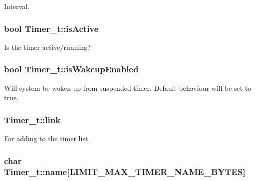 Interval. 

\subsubsection[{\texorpdfstring{is\+Active}{isActive}}]{\setlength{\rightskip}{0pt plus 5cm}bool Timer\+\_\+t\+::is\+Active}\hypertarget{struct_timer__t_ab30c837ffb98b2b38063d7a87da314d1}{}\label{struct_timer__t_ab30c837ffb98b2b38063d7a87da314d1}


Is the timer active/running? 

\subsubsection[{\texorpdfstring{is\+Wakeup\+Enabled}{isWakeupEnabled}}]{\setlength{\rightskip}{0pt plus 5cm}bool Timer\+\_\+t\+::is\+Wakeup\+Enabled}\hypertarget{struct_timer__t_a8c5f8bfe26e9a594a0fb272f522af293}{}\label{struct_timer__t_a8c5f8bfe26e9a594a0fb272f522af293}
Will system be woken up from suspended timer. Default behaviour will be set to true. 
\subsubsection[{\texorpdfstring{link}{link}}]{ Timer\+\_\+t\+::link}\hypertarget{struct_timer__t_aa089c17b518972d155f8430302933af0}{}\label{struct_timer__t_aa089c17b518972d155f8430302933af0}


For adding to the timer list. 

\subsubsection[{\texorpdfstring{name}{name}}]{\setlength{\rightskip}{0pt plus 5cm}char Timer\+\_\+t\+::name\mbox{[}{\bf L\+I\+M\+I\+T\+\_\+\+M\+A\+X\+\_\+\+T\+I\+M\+E\+R\+\_\+\+N\+A\+M\+E\+\_\+\+B\+Y\+T\+ES}\mbox{]}}\hypertarget{struct_timer__t_ac3cb8749c91ad906f50ad049447720c8}{}\label{struct_timer__t_ac3cb8749c91ad906f50ad049447720c8}


